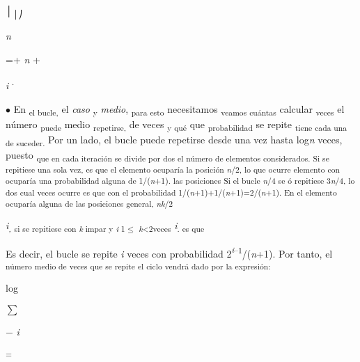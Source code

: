 \documentclass[12pt]{article}
\renewcommand{\_}{\kern-1.5pt\textunderscore\kern-1.5pt}
\begin{document}
│\textsubscript{│⎠}{\fontsize{7pt}{8.4pt}\selectfont \textit{n }\par}\par

=+ \textit{n }+ {\fontsize{7pt}{8.4pt}\selectfont \textit{i }\textsuperscript{. }\par}\par

\begin{justify}
{\fontsize{10pt}{12.0pt}\selectfont $\bullet$  En \textsubscript{el bucle, }el \textit{caso }\textsubscript{y }\textit{medio}, \textsubscript{para esto }necesitamos \textsubscript{veamos cuántas }calcular \textsubscript{veces }el número \textsubscript{puede }medio \textsubscript{repetirse, }de veces \textsubscript{y qué }que \textsubscript{probabilidad }se repite \textsubscript{tiene cada una de suceder. }Por un lado, el bucle puede repetirse desde una vez hasta log\textit{n }veces, puesto \textsubscript{que en cada iteración se divide por dos el número de elementos considerados. Si se repitiese una sola vez, es que el elemento ocuparía la posición \textit{n}/2, lo que ocurre elemento con ocuparía una probabilidad alguna de 1/(\textit{n}+1). las posiciones Si el bucle \textit{n}/4 se ó repitiese 3\textit{n}/4, lo dos cual veces ocurre es que con el probabilidad 1/(\textit{n}+1)+1/(\textit{n}+1)=2/(\textit{n}+1). En el elemento ocuparía alguna de las posiciones general, \textit{nk}/2}{\fontsize{7pt}{8.4pt}\selectfont \textit{i\textsubscript{, }}\textsubscript{si se repitiese con \textit{k }impar y \textit{i }1$ \leq $ \textit{k}<2veces }\textit{i}\textsubscript{. es que }{\fontsize{10pt}{12.0pt}\selectfont Es decir, el bucle se repite \textit{i }veces con probabilidad 2\textit{\textsuperscript{i}}\textsuperscript{–1}/(\textit{n}+1). Por tanto, el \textsubscript{número medio de veces que se repite el ciclo vendrá dado por la expresión: }\par}\par}\par}
\end{justify}\par

{\fontsize{6pt}{7.2pt}\selectfont log{\fontsize{17pt}{20.4pt}\selectfont $ \sum $ {\fontsize{6pt}{7.2pt}\selectfont $-$  \textit{i }\par}\par}\par}\par

\textsubscript{= }\par
\end{document}
